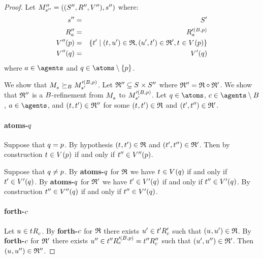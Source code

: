 \begin{proof}
Let $\kPModelAndTuplePP{\kStateSPP}$ where:
\begin{eqnarray*}
    \kStateSPP &=& \kStatesP\\
    \kAccessibilityPPA &=& \kAccessibilityA[\prime(\agentsB, \atomP)]\\
    \kValuationPP(\atomP) &=& \{\kStateTP \mid (\kStateT, \kStateUP) \in \bisimulation, (\kStateUP, \kStateTP) \in \refinement', \kStateT \in \kValuation(\atomP)\}\\
    \kValuationPP(\atomQ) &=& \kValuationP(\atomQ)
\end{eqnarray*}
where $\agentA \in \agents$ and $\atomQ \in \atoms \setminus \{\atomP\}$.

We show that $\kPModel{\kStateS} \simulatesBs \kPModel[\prime(\agentsB, \atomP)]{\kStateSP}$.
Let $\refinement'' \subseteq \kStates \times \kStatesPP$ where $\refinement'' = \bisimulation \circ \refinement'$.
We show that $\refinement''$ is a $\agentsB$-refinement from $\kPModel{\kStateS}$ to $\kPModel[\prime(\agentsB, \atomP)]{\kStateSP}$.
Let $\atomQ \in \atoms$, $\agentC \in \agents \setminus \agentsB$, $\agentA \in \agents$, and $(\kStateT, \kStateTP) \in \refinement''$ for some $(\kStateT, \kStateTP) \in \bisimulation$ and $(\kStateTP, \kStateTPP) \in \refinement'$.

\paragraph{atoms-$\atomQ$}
Suppose that $\atomQ = \atomP$.
By hypothesis $(\kStateT, \kStateTP) \in \bisimulation$ and $(\kStateTP, \kStateTPP) \in \refinement'$.
Then by construction $\kStateT \in \kValuation(\atomP)$ if and only if $\kStateTPP \in \kValuationPP(\atomP)$.

Suppose that $\atomQ \neq \atomP$.
By {\bf atoms-$\atomQ$} for $\bisimulation$ we have $\kStateT \in \kValuation(\atomQ)$ if and only if $\kStateTP \in \kValuationP(\atomQ)$.
By {\bf atoms-$\atomQ$} for $\refinement'$ we have $\kStateTP \in \kValuationP(\atomQ)$ if and only if $\kStateTPP \in \kValuationP(\atomQ)$.
By construction $\kStateTPP \in \kValuationPP(\atomQ)$ if and only if $\kStateTPP \in \kValuationP(\atomQ)$.

\paragraph{forth-$\agentC$}
Let $\kStateU \in \kSuccessorsC{\kStateT}$.
By {\bf forth-$\agentC$} for $\bisimulation$ there exists $\kStateUP \in \kSuccessorsPC{\kStateTP}$ such that $(\kStateU, \kStateUP) \in \bisimulation$.
By {\bf forth-$\agentC$} for $\refinement'$ there exists $\kStateUPP \in \kSuccessorsC[\prime(\agentsB, \atomP)]{\kStateTPP} = \kSuccessorsPPC{\kStateTPP}$ such that $(\kStateUP, \kStateUPP) \in \refinement'$.
Then $(\kStateU, \kStateUPP) \in \refinement''$.


\end{proof}
